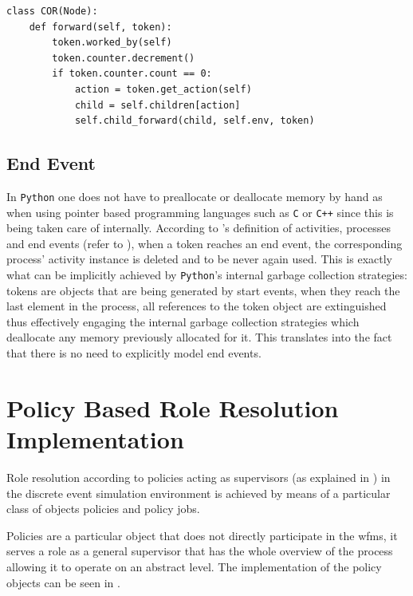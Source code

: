 \begin{lstlisting}[caption=Token's counter decrement logic at a convergent \glsentryshort{or} gateway,label=lst:or_counter_decrement,style=CustomPython]
class COR(Node):
    def forward(self, token):
        token.worked_by(self)
        token.counter.decrement()
        if token.counter.count == 0:
            action = token.get_action(self)
            child = self.children[action]
            self.child_forward(child, self.env, token)
\end{lstlisting}

\subsection{End Event}

In \texttt{Python} one does not have to preallocate or deallocate memory by hand as when using pointer based programming languages such as \texttt{C} or \texttt{C++} since this is being taken care of internally. According to \citet{Silver2011}'s definition of activities, processes and end events (refer to ), when a token reaches an end event, the corresponding process' activity instance is deleted and to be never again used. This is exactly what can be implicitly achieved by \texttt{Python}'s internal garbage collection strategies: tokens are objects that are being generated by start events, when they reach the last element in the process, all references to the token object are extinguished thus effectively engaging the internal garbage collection strategies which deallocate any memory previously allocated for it. This translates into the fact that there is no need to explicitly model end events.

\section{Policy Based Role Resolution Implementation}
\label{sec:policy_implementation}
Role resolution according to policies acting as supervisors (as explained in ) in the discrete event simulation environment is achieved by means of a particular class of objects \ie policies and policy jobs.

Policies are a particular object that does not directly participate in the \gls{wfms}, it serves a role as a general supervisor that has the whole overview of the process allowing it to operate on an abstract level. The implementation of the policy objects can be seen in .


